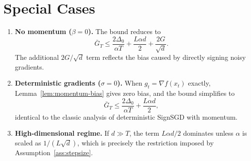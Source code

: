 \documentclass[11pt]{article}
\begin{document}
\section*{Special Cases}
\begin{enumerate}[leftmargin=*]
\item \textbf{No momentum ($\beta=0$).}  
The bound reduces to
\[
\bar{G}_T\le\frac{2\Delta_0}{\alpha T}
            +\frac{L\alpha d}{2}
            +\frac{2G}{\sqrt{d}} .
\]
The additional $2G/\sqrt{d}$ term reflects the bias caused by directly signing noisy gradients.

\item \textbf{Deterministic gradients ($\sigma=0$).}  
When $g_t=\nabla f(x_t)$ exactly, Lemma~\ref{lem:momentum-bias} gives zero bias, and the bound simplifies to
\[
\bar{G}_T\le\frac{2\Delta_0}{\alpha T}
            +\frac{L\alpha d}{2},
\]
identical to the classic analysis of deterministic SignSGD with momentum.

\item \textbf{High‑dimensional regime.}  
If $d\gg T$, the term $L\alpha d/2$ dominates unless $\alpha$ is scaled as $1/(L\sqrt{d})$, which is precisely the restriction imposed by Assumption~\ref{ass:stepsize}.
\end{enumerate}
\end{document}
